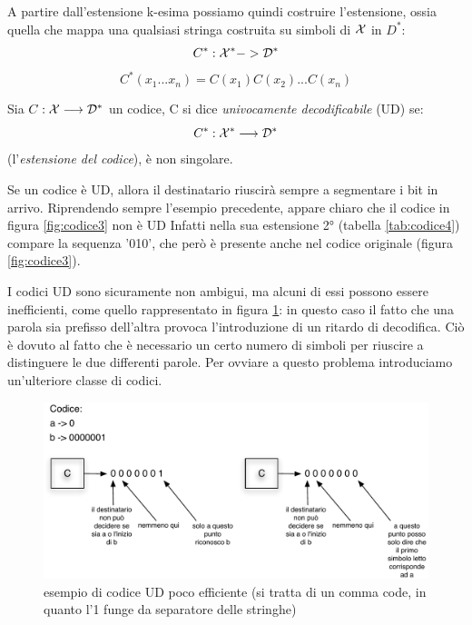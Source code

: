 A partire dall'estensione k-esima possiamo quindi costruire l'estensione, ossia quella che mappa una qualsiasi stringa costruita su simboli di \(\mathcal{X}\) in $D^*$:
\[C^*: \mathcal{X}^* -> \mathcal{D}^*\]
\[C^*(x_1... x_n) = C(x_1) C(x_2) ... C(x_n)\]

\begin{definizione}[Codice U.D.]
Sia \(C: \mathcal{X} \longrightarrow \mathcal{D}^*\) un codice, C si dice \textit{univocamente decodificabile} (UD) se:
\[C^*: \mathcal{X}^* \longrightarrow \mathcal{D}^*\]
(l'\textit{estensione del codice}), è non singolare.
\label{codiceUD}
\end{definizione}

Se un codice è UD, allora il destinatario riuscirà sempre a segmentare i bit in arrivo.
Riprendendo sempre l'esempio precedente, appare chiaro che il codice in figura \ref{fig:codice3}  non è UD Infatti nella sua estensione 2° (tabella \ref{tab:codice4}) compare la sequenza '010', che però è presente anche nel codice originale (figura \ref{fig:codice3}).


I codici UD sono sicuramente non ambigui, ma alcuni di essi possono essere inefficienti, come quello rappresentato in figura \ref{fig:0024}: in questo caso il fatto che una parola sia prefisso dell'altra provoca l'introduzione di un ritardo di decodifica. Ciò è dovuto al fatto che è necessario un certo numero di simboli per riuscire a distinguere le due differenti parole. Per ovviare a questo problema introduciamo un'ulteriore classe di codici.

\begin{figure}[htbp]
\begin{center}
	\includegraphics[width=\textwidth]{img/istantaneo.pdf}
\caption{esempio di codice UD poco efficiente (si tratta di un comma code, in quanto l'1 funge da separatore delle stringhe)}
\label{fig:0024}
\end{center}
\end{figure}

